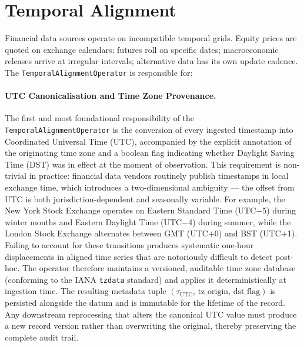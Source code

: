 \documentclass[12pt,openany]{book}
\numberwithin{equation}{chapter}
\theoremstyle{plain}
\theoremstyle{definition}
\theoremstyle{remark}
\begin{document}
\section{Temporal Alignment}

Financial data sources operate on incompatible temporal grids. Equity
prices are quoted on exchange calendars; futures roll on specific dates;
macroeconomic releases arrive at irregular intervals; alternative data
has its own update cadence. The \texttt{TemporalAlignmentOperator} is
responsible for:


\paragraph{UTC Canonicalisation and Time Zone Provenance.}
The first and most foundational responsibility of the \texttt{TemporalAlignmentOperator} is the
conversion of every ingested timestamp into Coordinated Universal Time (UTC), accompanied by the
explicit annotation of the originating time zone and a boolean flag indicating whether Daylight
Saving Time (DST) was in effect at the moment of observation. This requirement is non-trivial in
practice: financial data vendors routinely publish timestamps in local exchange time, which
introduces a two-dimensional ambiguity — the offset from UTC is both jurisdiction-dependent and
seasonally variable. For example, the New York Stock Exchange operates on Eastern Standard Time
(UTC$-$5) during winter months and Eastern Daylight Time (UTC$-$4) during summer, while the
London Stock Exchange alternates between GMT (UTC$+$0) and BST (UTC$+$1). Failing to account for
these transitions produces systematic one-hour displacements in aligned time series that are
notoriously difficult to detect post-hoc. The operator therefore maintains a versioned, auditable
time zone database (conforming to the IANA \texttt{tzdata} standard) and applies it deterministically
at ingestion time. The resulting metadata tuple $(\tau_{\mathrm{UTC}},\, \mathrm{tz\_origin},\,
\mathrm{dst\_flag})$ is persisted alongside the datum and is immutable for the lifetime of the
record. Any downstream reprocessing that alters the canonical UTC value must produce a new record
version rather than overwriting the original, thereby preserving the complete audit trail.
\end{document}
